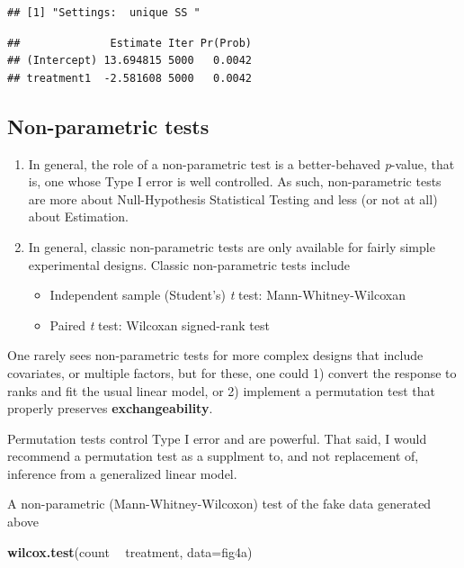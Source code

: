 \documentclass[]{book}
\newenvironment{Shaded}{\begin{snugshade}}{\end{snugshade}}
\newcommand{\DataTypeTok}[1]{\textcolor[rgb]{0.13,0.29,0.53}{#1}}
\newcommand{\KeywordTok}[1]{\textcolor[rgb]{0.13,0.29,0.53}{\textbf{#1}}}
\newcommand{\NormalTok}[1]{#1}
\newcommand{\OperatorTok}[1]{\textcolor[rgb]{0.81,0.36,0.00}{\textbf{#1}}}
\newcommand{\StringTok}[1]{\textcolor[rgb]{0.31,0.60,0.02}{#1}}
\providecommand{\tightlist}{%
  \setlength{\itemsep}{0pt}\setlength{\parskip}{0pt}}
\begin{document}
\begin{verbatim}
## [1] "Settings:  unique SS "
\end{verbatim}

\begin{verbatim}
##              Estimate Iter Pr(Prob)
## (Intercept) 13.694815 5000   0.0042
## treatment1  -2.581608 5000   0.0042
\end{verbatim}

\hypertarget{non-parametric-tests}{%
\subsection{Non-parametric tests}\label{non-parametric-tests}}

\begin{enumerate}
\def\labelenumi{\arabic{enumi}.}
\tightlist
\item
  In general, the role of a non-parametric test is a better-behaved \emph{p}-value, that is, one whose Type I error is well controlled. As such, non-parametric tests are more about Null-Hypothesis Statistical Testing and less (or not at all) about Estimation.
\item
  In general, classic non-parametric tests are only available for fairly simple experimental designs. Classic non-parametric tests include

  \begin{itemize}
  \tightlist
  \item
    Independent sample (Student's) \emph{t} test: Mann-Whitney-Wilcoxan
  \item
    Paired \emph{t} test: Wilcoxan signed-rank test
  \end{itemize}
\end{enumerate}

One rarely sees non-parametric tests for more complex designs that include covariates, or multiple factors, but for these, one could 1) convert the response to ranks and fit the usual linear model, or 2) implement a permutation test that properly preserves \textbf{exchangeability}.

Permutation tests control Type I error and are powerful. That said, I would recommend a permutation test as a supplment to, and not replacement of, inference from a generalized linear model.

A non-parametric (Mann-Whitney-Wilcoxon) test of the fake data generated above

\begin{Shaded}
\begin{Highlighting}[]
\KeywordTok{wilcox.test}\NormalTok{(count }\OperatorTok{~}\StringTok{ }\NormalTok{treatment, }\DataTypeTok{data=}\NormalTok{fig4a)}
\end{Highlighting}
\end{Shaded}
\end{document}
